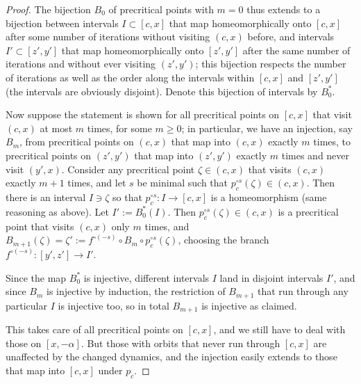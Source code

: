 \documentclass[12pt]{amsart}
\newcommand{\0}{\texttt{0}}
\newcommand{\1}{\texttt{1}}
\theoremstyle{definition}
\numberwithin{equation}{section}
\begin{document}
\begin{proof}
The bijection $B_0$ of precritical points with $m=0$ thus extends to a bijection between intervals $I\subset[c,x]$ that map homeomorphically onto $[c,x]$ after some number of iterations without visiting $(c,x)$ before, and intervals $I'\subset [z',y']$ that map homeomorphically onto $[z',y']$ after the same number of iterations and without ever visiting $(z',y')$; this bijection respects the number of iterations as well as the order along the intervals within $[c,x]$ and $[z',y']$ (the intervals are obviously disjoint). Denote this bijection of intervals by $B^*_0$.



Now suppose the statement is shown for all precritical points on $[c,x]$ that visit $(c,x)$ at most $m$ times, for some $m\ge 0$; in particular, we have an injection, say $B_m$, from precritical points on $(c,x)$ that map into $(c,x)$ exactly $m$ times, to precritical points on $(z',y')$ that map into $(z',y')$ exactly $m$ times {and never visit $(y',x)$}. Consider any precritical point $\zeta\in(c,x)$ that visits $(c,x)$ exactly $m+1$ times, and let $s$ be minimal such that $p_c^{\circ s}(\zeta)\in(c,x)$. Then there is an interval $I\ni \zeta$ so that $p_c^{\circ s}\colon I\to[c,x]$ is a homeomorphism (same reasoning as above).
Let $I':=B^*_0(I)$. Then $p_c^{\circ s}(\zeta)\in(c,x)$ is a precritical point that visits $(c,x)$ only $m$ times, and $B_{m+1}(\zeta)=\zeta':= f^{\circ(-s)}\circ B_m \circ p_c^{\circ s}(\zeta)$, choosing the branch $f^{\circ(-s)}\colon [y',z']\to I'$.

Since the map $B^*_0$ is injective, different intervals $I$ land in disjoint intervals $I'$, and since $B_m$ is injective by induction, the restriction of $B_{m+1}$ that run through any particular $I$ is injective too, so in total $B_{m+1}$ is injective as claimed. 

This takes care of all precritical points on $[c,x]$, and we still have to deal with those on $[x,-\alpha]$. But those with orbits that never run through $[c,x]$ are unaffected by the changed dynamics, and the injection easily extends to those that map into $[c,x]$ under $p_c$.


\end{proof}
\end{document}
